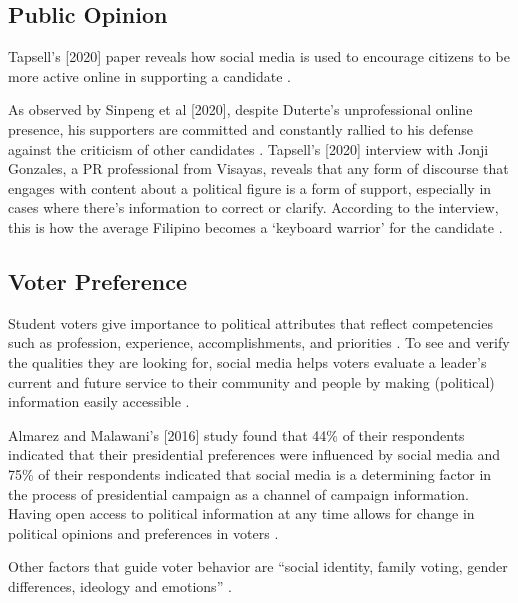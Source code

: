 \subsection{Public Opinion}
Tapsell’s [2020] paper reveals how social media is used to encourage citizens to be more active online in supporting a candidate \cite{Tapsell-2020}.

As observed by Sinpeng et al [2020], despite Duterte’s unprofessional online presence, his supporters are committed and constantly rallied to his defense against the criticism of other candidates \cite{Sinpeng-2020}. Tapsell’s [2020] interview with Jonji Gonzales, a PR professional from Visayas, reveals that any form of discourse that engages with content about a political figure is a form of support, especially in cases where there’s information to correct or clarify. According to the interview, this is how the average Filipino becomes a ‘keyboard warrior’ for the candidate \cite{Tapsell-2020}.

\subsection{Voter Preference}
Student voters give importance to political attributes that reflect competencies such as profession, experience, accomplishments, and priorities \cite{Anabo-2021}. To see and verify the qualities they are looking for, social media helps voters evaluate a leader’s current and future service to their community and people by making (political) information easily accessible \cite{Campanero-2021}.

Almarez and Malawani’s [2016] study found that 44\% of their respondents indicated that their presidential preferences were influenced by social media and 75\% of their respondents indicated that social media is a determining factor in the process of presidential campaign as a channel of campaign information. Having open access to political information at any time allows for change in political opinions and preferences in voters \cite{Almarez-2016}.

Other factors that guide voter behavior are “social identity, family voting, gender differences, ideology and emotions” \cite{Qorri-2018}.
